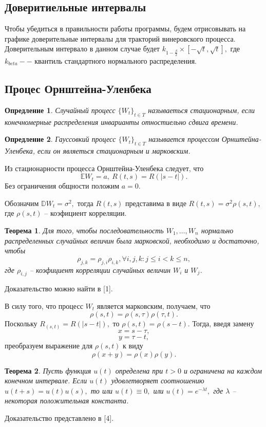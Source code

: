 \documentclass[11pt]{article}
\newtheorem{theorem}{Теорема}
\newtheorem{definition}{Опредление}
\numberwithin{equation}{section}
\begin{document}
\subsection{Доверитиельные интервалы}
Чтобы убедиться в правильности работы программы, будем отрисовывать на графике 
доверительные интервалы для тракторий винеровского процесса. Доверительным интервало в данном случае будет 
$k_{1-\frac{\beta}{2}} \times [-\sqrt{t}, \sqrt{t}],$ где $k_{beta}--$ квантиль стандартного нормального распределения.
\subsection{Процес Орнштейна-Уленбека}
\begin{definition}
  Случайный процесс $\{ W_t \}_{t \in T}$ называеться стационарным, если конечномерные распределения инварианты отностиельно сдвига времени.
\end{definition}
\begin{definition}
  Гауссовкий процесс $\{W_t\}_{t \in T}$ называется процессом Орнштейна-Уленбека, если он являеться стационарным и марковским.
\end{definition}

Из стационарности процесса Орнштейна-Уленбека следует, что
$$ \mathbb{E}W_t = a, \ R(t,s) = R(|s-t|).$$
Без ограничения общности положим $a=0$.

Обозначим $\mathbb{D}W_t = \sigma^2,$ тогда $R(t,s)$ представима в виде $R(t,s) = \sigma^2 \rho(s,t),$
где $\rho(s,t)$ -- коэфициент корреляции.
\begin{theorem}
  Для того, чтобы последовательность $W_1, \dots, W_n$ нормально распределенных случайных величин была марковской,
  необходимо и достаточно, чтобы 
  $$ \rho_{j,k} = \rho_{j,i} \rho_{i,k}, \forall i,j,k : j \leq i < k \leq n,$$
  где $\rho_{i,j}$ -- коэфициент корреляции случайных величин $W_i$ и $W_j$.
\end{theorem}
Доказательство можно найти в [1].

В силу того, что процесс $W_t$ является марковским, получаем, что 
$$ \rho(s,t) = \rho(s,\tau) \rho(\tau,t).$$
Поскольку $R_(s,t) = R(|s-t|),$ то $\rho(s,t) = \rho(s-t).$ Тогда, введя замену 
$$ x = s - \tau,$$ 
$$ y = \tau -t,$$
преобразуем выражение для $\rho(s,t)$ к виду
$$ \rho(x+y) = \rho(x) \rho(y).$$ 
\begin{theorem}
  Пусть функция $u(t)$ определена при $t>0$ и ограничена на каждом конечном интервале. 
  Если $u(t)$ удовлетворяет соотношению $u(t+s) = u(t)u(s),$ то или $u(t) \equiv 0,$ или
  $u(t) = e^{-\lambda t},$ где $\lambda$ -- некоторая положительная константа.
\end{theorem}
Доказательство представлено в [4].
\end{document}
